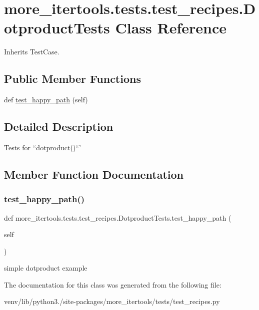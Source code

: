 \hypertarget{classmore__itertools_1_1tests_1_1test__recipes_1_1_dotproduct_tests}{}\section{more\+\_\+itertools.\+tests.\+test\+\_\+recipes.\+Dotproduct\+Tests Class Reference}
\label{classmore__itertools_1_1tests_1_1test__recipes_1_1_dotproduct_tests}


Inherits Test\+Case.

\subsection*{Public Member Functions}
\begin{DoxyCompactItemize}
\item 
def \hyperlink{classmore__itertools_1_1tests_1_1test__recipes_1_1_dotproduct_tests_ab610298fbb3926565dfa16779ddda1f4}{test\+\_\+happy\+\_\+path} (self)
\end{DoxyCompactItemize}


\subsection{Detailed Description}
\begin{DoxyVerb}Tests for ``dotproduct()``'\end{DoxyVerb}
 

\subsection{Member Function Documentation}
\mbox{\label{classmore__itertools_1_1tests_1_1test__recipes_1_1_dotproduct_tests_ab610298fbb3926565dfa16779ddda1f4}} 
\subsubsection{\texorpdfstring{test\+\_\+happy\+\_\+path()}{test\_happy\_path()}}
{\footnotesize\ttfamily def more\+\_\+itertools.\+tests.\+test\+\_\+recipes.\+Dotproduct\+Tests.\+test\+\_\+happy\+\_\+path (\begin{DoxyParamCaption}\item[{}]{self }\end{DoxyParamCaption})}

\begin{DoxyVerb}simple dotproduct example\end{DoxyVerb}
 

The documentation for this class was generated from the following file\+:\begin{DoxyCompactItemize}
\item 
venv/lib/python3./site-\/packages/more\+\_\+itertools/tests/test\+\_\+recipes.\+py\end{DoxyCompactItemize}

